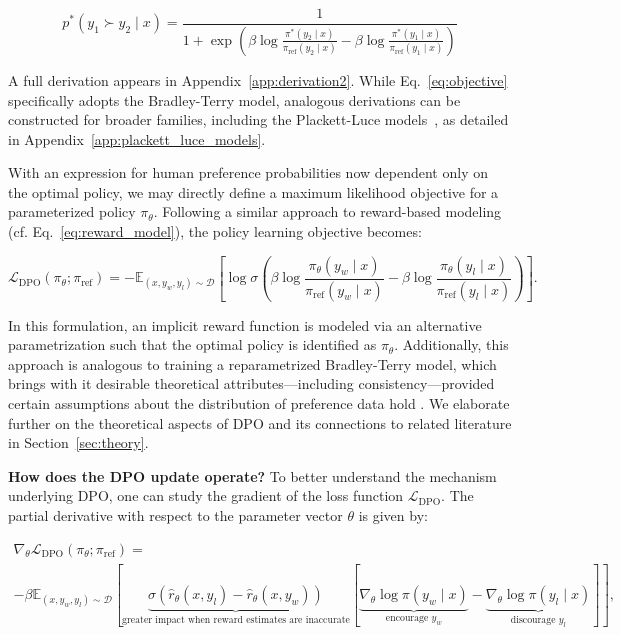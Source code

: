 \begin{equation}\label{eq:objective}
    p^*(y_1\succ y_2 \mid x)=\frac{1}{1 + \exp\left(\beta \log \frac{\pi^*(y_2\mid x)}{\pi_\text{ref}(y_2\mid x)} - \beta \log \frac{\pi^*(y_1\mid x)}{\pi_\text{ref}(y_1\mid x)}\right)}
\end{equation}

A full derivation appears in Appendix~\ref{app:derivation2}. While Eq.~\ref{eq:objective} specifically adopts the Bradley-Terry model, analogous derivations can be constructed for broader families, including the Plackett-Luce models~\citep{plackett1975analysis, luce2012individual}, as detailed in Appendix~\ref{app:plackett_luce_models}.

With an expression for human preference probabilities now dependent only on the optimal policy, we may directly define a maximum likelihood objective for a parameterized policy $\pi_\theta$. Following a similar approach to reward-based modeling (cf. Eq.~\ref{eq:reward_model}), the policy learning objective becomes:

\begin{equation}\label{eq:optimum_model}
    \mathcal{L}_\text{DPO}(\pi_{\theta}; \pi_\text{ref}) = -\mathbb{E}_{(x, y_w, y_l)\sim \mathcal{D}}\left[\log \sigma \left(\beta \log \frac{\pi_{\theta}(y_w\mid x)}{\pi_\text{ref}(y_w\mid x)} - \beta \log \frac{\pi_{\theta}(y_l\mid x)}{\pi_\text{ref}(y_l\mid x)}\right)\right].
\end{equation}

In this formulation, an implicit reward function is modeled via an alternative parametrization such that the optimal policy is identified as $\pi_\theta$. Additionally, this approach is analogous to training a reparametrized Bradley-Terry model, which brings with it desirable theoretical attributes—including consistency—provided certain assumptions about the distribution of preference data hold \cite{bong2022generalized}. We elaborate further on the theoretical aspects of DPO and its connections to related literature in Section~\ref{sec:theory}.

\textbf{How does the DPO update operate?} To better understand the mechanism underlying DPO, one can study the gradient of the loss function $\mathcal{L}_\text{DPO}$. The partial derivative with respect to the parameter vector $\theta$ is given by:

\begin{multline*}\label{eq:gradient}
    \nabla_\theta \mathcal{L}_\text{DPO}(\pi_\theta;\pi_\text{ref}) = \\ -\beta\mathbb{E}_{(x, y_w, y_l) \sim \mathcal{D}} \left[\underbrace{\sigma(\hat{r}_\theta(x, y_l) - \hat{r}_\theta(x, y_w))}_\text{greater impact when reward estimates are inaccurate}\left[\underbrace{\nabla_\theta\log \pi(y_w \mid x)}_\text{encourage $y_w$} - \underbrace{\nabla_\theta\log\pi(y_l \mid x)}_\text{discourage $y_l$}\right]\right],
\end{multline*}

